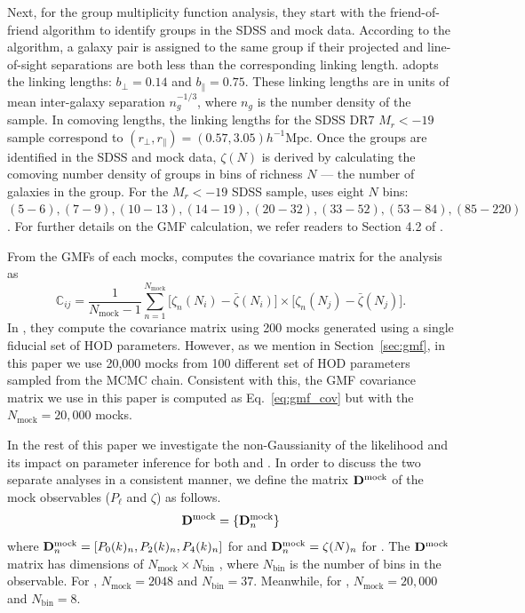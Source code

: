 \documentclass[12pt, letterpaper, preprint]{aastex}
\newcommand{\beq}{\begin{equation}}
\newcommand{\eeq}{\end{equation}}
\newcommand{\Dmock}{{\bf D}^\mathrm{mock}}
\newcommand{\Beut}{\citetalias{beutler2017}}
\newcommand{\Sinh}{\citetalias{sinha2017a}}
\begin{document}
Next, for the \cite{sinha2017a} group multiplicity function analysis, 
they start with the \cite{berlind2006} friend-of-friend algorithm to 
identify groups in the SDSS and mock data. According to the algorithm, a 
galaxy pair is assigned to the same group if their projected and line-of-sight 
separations are both less than the corresponding linking length. \cite{sinha2017a} 
adopts the \cite{berlind2006} linking lengths: $b_\perp = 0.14$ and $b_\parallel = 0.75$.
These linking lengths are in units of  mean inter-galaxy separation 
$n_g^{-1/3}$, where $n_g$ is the number density of the sample. In comoving
lengths, the linking lengths for the SDSS DR7 $M_r < -19$ sample correspond to
$(r_\perp, r_\parallel) = (0.57, 3.05)h^{-1}\mathrm{Mpc}$. 
Once the groups are identified in the SDSS and mock data, $\zeta(N)$
is derived by calculating the comoving number density of groups 
in bins of richness $N$ --- the number of galaxies in the group. 
For the $M_r < −19$ SDSS sample, \cite{sinha2017a} uses eight $N$ bins: 
$(5 - 6), (7 - 9), (10 - 13), (14 - 19), (20 - 32), (33 - 52), (53 - 84), (85 - 220)$.
For further details on the GMF calculation, we refer readers to Section 4.2
of \cite{sinha2017a}. 

From the GMFs of each mocks, \cite{sinha2017a} computes the covariance
matrix for the analysis as 
\beq \label{eq:gmf_cov} 
\mathbb{C}_{ij} = \frac{1}{N_\mathrm{mock} -1} \sum\limits_{n=1}^{N_\mathrm{mock}} \big[\zeta_n(N_i) -  \bar{\zeta}(N_i)\big] \times
    \big[\zeta_n(N_j) -  \bar{\zeta}(N_j)\big].
\eeq
In \cite{sinha2017a}, they compute the covariance matrix using 200 mocks
generated using a single fiducial set of HOD parameters. However, as we 
mention in Section~\ref{sec:gmf}, in this paper we use 20,000 mocks from 
100 different set of HOD parameters sampled from the MCMC chain. Consistent
with this, the GMF covariance matrix we use in this paper is computed as
Eq.~\ref{eq:gmf_cov} but with the $N_\mathrm{mock} = 20,000$ mocks. 

In the rest of this paper we investigate the non-Gaussianity of the 
likelihood and its impact on parameter inference for both \cite{beutler2017} 
and \cite{sinha2017a}. In order to discuss the two separate analyses
in a consistent manner, we define the matrix $\Dmock$ of 
the mock observables ($P_\ell$ and $\zeta$) as follows. 
\beq
\Dmock = \{{\bf D}^\mathrm{mock}_n\}
\eeq
where $\Dmock_n = [P_0(k)_n,P_2(k)_n,P_4(k)_n]$ for 
\cite{beutler2017} and $\Dmock_n = \zeta(N)_n$ for 
\cite{sinha2017a}. The $\Dmock$ matrix has dimensions of 
$N_\mathrm{mock} \times N_\mathrm{bin}$ , where $N_\mathrm{bin}$
is the number of bins in the observable. For \Beut, 
$N_\mathrm{mock} = 2048$ and $N_\mathrm{bin} = 37$. Meanwhile, 
for \Sinh, $N_\mathrm{mock} = 20,000$ and $N_\mathrm{bin} = 8$.
\end{document}
